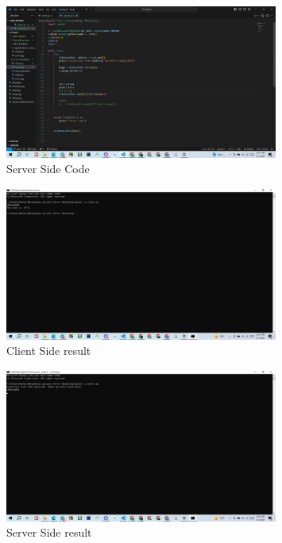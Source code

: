 \documentclass[11pt]{article}
\begin{document}
\begin{itemize}
    \begin{figure}[H]
        \centering
        \includegraphics[width=0.8\textwidth]{Error_server.png}
        \caption{Server Side Code}
        \label{fig:2}
    \end{figure}
    
    \begin{figure}[H]
      \centering
      \includegraphics[width=0.8\textwidth]{Error_result_client.png}
      \caption{Client Side result}
      \label{fig:3}
    \end{figure}
    
    \begin{figure}[H]
      \centering
      \includegraphics[width=0.8\textwidth]{Error_result_server.png}
      \caption{Server Side result}
      \label{fig:4}
    \end{figure}

\end{itemize}
\end{document}
